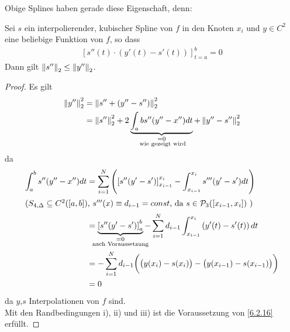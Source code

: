 Obige Splines haben gerade diese Eigenschaft, denn:

\begin{Satze}\label{6.2.16}
  Sei $s$ ein interpolierender, kubischer Spline von $f$
 in den Knoten $x_i $ und $y\in C^2$ eine beliebige Funktion
von $f$, so dass 
\begin{gather*}
  \left[s''(t)\cdot(y'(t)-s'(t))\right]_{t=a}^{b}=0
\end{gather*}
Dann gilt $\left\| s'' \right\|_2 \leq \left\| y'' \right\|_2$.

\begin{proof}
 Es gilt
\begin{align*}
  \nn{y''}_2^2 &= \nn{s''+(y''-s'')}_2^2\\
               &= \nn{s''}_2^2
                 + 2\underbrace{\int_{a}{b}s''(y''-x'')dt}_{
                 \mathclap{\substack{=0 \\ \text{ wie gezeigt wird}}}
  }
  + \nn{y''-s''}_2^2
\end{align*}
da
\begin{align*}
\int_{a}^{b} s''(y''-x'')dt &= \sum_{i=1}^{N}\left(\left[
                             s''(y'-s')\right]_{x_{i-1}}^{x_i}
                              -\int_{x_{i-1}}^{x_i}s'''(y'-s')dt\right)\\
  \intertext{($S_{4,\Delta}\subseteq C^2([a,b])$, 
  $s'''(x)\equiv d_{i-1}=const$, 
  da 
  $s\in\mathcal{P}_3([x_{i-1},x_i])$ )
  }
 &= \underbrace{\left[ s''(y'-s')\right]_{a}^{b}}_{
   \mathclap{\substack{ =0 \\ \text{ nach Voraussetzung } }}
  }
   -\sum_{i=1}^{N} d_{i-1}
   \int_{x_{i-1}}^{x_i} \left(y'(t)-s'(t)\right) dt\\
&=-\sum_{i=1}^N d_{i-1}\bigg(\big(y(x_i)-s(x_i)\big)
   - \big(y(x_{i-1})-s(x_{i-1})\big)\bigg) \\
 &=0
\end{align*}
da $y$,$s$ Interpolationen von $f$ sind.\\
Mit den Randbedingungen i), ii) und iii) 
ist die Voraussetzung von \ref{6.2.16} erfüllt.
\end{proof}
\end{Satze}

